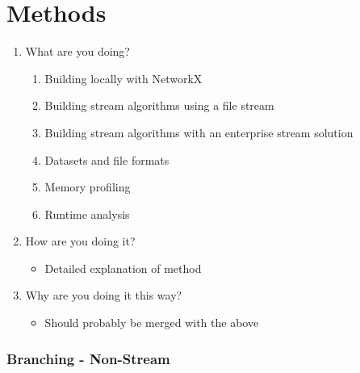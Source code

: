 \section{Methods}

\begin{enumerate}
    \item What are you doing?
          \begin{enumerate}
              \item Building locally with NetworkX
              \item Building stream algorithms using a file stream
              \item Building stream algorithms with an enterprise stream solution
              \item Datasets and file formats
              \item Memory profiling
              \item Runtime analysis
          \end{enumerate}
    \item How are you doing it?
          \begin{itemize}
              \item Detailed explanation of method
          \end{itemize}
    \item Why are you doing it this way?
          \begin{itemize}
              \item Should probably be merged with the above
          \end{itemize}
\end{enumerate}

\subsubsection{Branching - Non-Stream}

